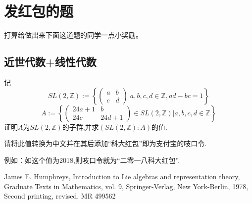 \documentclass[11pt,A4paper,oneside]{amsart}
\numberwithin{equation}{section}
\theoremstyle{plain}
\theoremstyle{plain}
\numberwithin{equation}{section}
\theoremstyle{remark}
\begin{document}
\section{发红包的题}
打算给做出来下面这道题的同学一点小奖励。

\subsection{近世代数+线性代数}
记
$$SL(2,\mathbb{Z}):=\left\{
\begin{pmatrix}
a & b \\
c & d
\end{pmatrix}\bigg| a,b,c,d \in \mathbb{Z}, ad-bc=1 \right\}$$
$$A:=\left\{
\begin{pmatrix}
24a+1 & b \\
24c & 24d+1
\end{pmatrix} \in SL(2,\mathbb{Z}) \bigg| a,b,c,d \in \mathbb{Z} \right\}$$
证明$A$为$SL(2,\mathbb{Z})$的子群,并求$(SL(2,\mathbb{Z}):A)$的值.

请将此值转换为中文并在其后添加“科大红包”即为支付宝的吱口令.

例如：如这个值为2018,则吱口令就为“二零一八科大红包”.













\begin{thebibliography}{99}


%
James E. Humphreys, Introduction to Lie algebras and representation theory, Graduate
Texts in Mathematics, vol. 9, Springer-Verlag, New York-Berlin, 1978, Second printing,
revised. MR 499562





\end{thebibliography}
\end{document}
